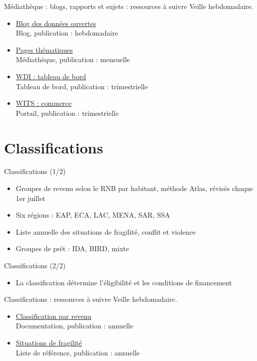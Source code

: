 \documentclass[aspectratio=169,11pt]{beamer}
\begin{document}
\begin{frame}{Médiathèque : blogs, rapports et sujets : ressources à suivre}
\small
Veille hebdomadaire.
\begin{itemize}
\item \href{https://blogs.worldbank.org/en/opendata}{Blog des données ouvertes}\\{\footnotesize Blog, publication : hebdomadaire}
\item \href{https://datatopics.worldbank.org}{Pages thématiques}\\{\footnotesize Médiathèque, publication : mensuelle}
\item \href{https://datatopics.worldbank.org/world-development-indicators/}{WDI : tableau de bord}\\{\footnotesize Tableau de bord, publication : trimestrielle}
\item \href{https://wits.worldbank.org}{WITS : commerce}\\{\footnotesize Portail, publication : trimestrielle}
\end{itemize}
\end{frame}

\section{Classifications}
\begin{frame}{Classifications (1/2)}
\begin{itemize}
\item Groupes de revenu selon le RNB par habitant, méthode Atlas, révisés chaque 1er juillet
\item Six régions : EAP, ECA, LAC, MENA, SAR, SSA
\item Liste annuelle des situations de fragilité, conflit et violence
\item Groupes de prêt : IDA, BIRD, mixte
\end{itemize}
\end{frame}

\begin{frame}{Classifications (2/2)}
\begin{itemize}
\item La classification détermine l'éligibilité et les conditions de financement
\end{itemize}
\end{frame}

\begin{frame}{Classifications : ressources à suivre}
\small
Veille hebdomadaire.
\begin{itemize}
\item \href{https://datahelpdesk.worldbank.org/knowledgebase/articles/906519-world-bank-country-and-lending-groups}{Classification par revenu}\\{\footnotesize Documentation, publication : annuelle}
\item \href{https://www.worldbank.org/en/topic/fragilityconflictviolence/brief/harmonized-list-of-fragile-situations}{Situations de fragilité}\\{\footnotesize Liste de référence, publication : annuelle}
\end{itemize}
\end{frame}
\end{document}
